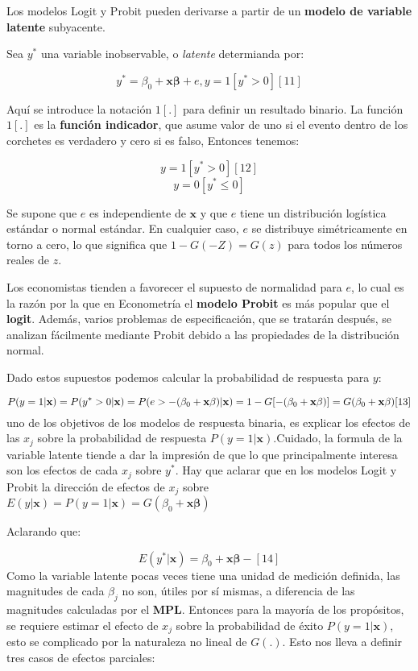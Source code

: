 \documentclass[
  letterpaper,
  DIV=11,
  numbers=noendperiod]{scrreprt}
\begin{document}
Los modelos Logit y Probit pueden derivarse a partir de un
\textbf{modelo de variable latente} subyacente.

Sea \(y^*\) una variable inobservable, o \emph{latente} determianda por:

\[y^*=\beta_0+ \mathbf{x\beta}+e, y=1[y^*>0][11]\]

Aquí se introduce la notación \(1[.]\) para definir un resultado
binario. La función \(1[.]\) es la \textbf{función indicador}, que asume
valor de uno si el evento dentro de los corchetes es verdadero y cero si
es falso, Entonces tenemos:

\[y=1[y^*>0][12]\] \[y=0[y^*\leq0]\]

Se supone que \(e\) es independiente de \(\mathbf{x}\) y que \(e\) tiene
un distribución logística estándar o normal estándar. En cualquier caso,
\(e\) se distribuye simétricamente en torno a cero, lo que significa que
\(1-G(-Z)=G(z)\) para todos los números reales de \(z\).

Los economistas tienden a favorecer el supuesto de normalidad para
\(e\), lo cual es la razón por la que en Econometría el \textbf{modelo
Probit} es más popular que el \textbf{logit}. Además, varios problemas
de especificación, que se tratarán después, se analizan fácilmente
mediante Probit debido a las propiedades de la distribución normal.

Dado estos supuestos podemos calcular la probabilidad de respuesta para
\(y\):

\[P(y=1|\mathbf{x})=P(y^*>0|\mathbf{x})=P(e>-(\beta_0+\mathbf{x\beta})|\mathbf{x})=\\1-G[-(\beta_0+\mathbf{x\beta})]=G(\beta_0+\mathbf{x\beta})[13]\]
uno de los objetivos de los modelos de respuesta binaria, es explicar
los efectos de las \(x_j\) sobre la probabilidad de respuesta
\(P(y=1|\mathbf{x})\).Cuidado, la formula de la variable latente tiende
a dar la impresión de que lo que principalmente interesa son los efectos
de cada \(x_j\) sobre \(y^*\). Hay que aclarar que en los modelos Logit
y Probit la dirección de efectos de \(x_j\) sobre
\(E(y|\mathbf{x})=P(y=1|\mathbf{x})=G(\beta_0+\mathbf{x\beta})\)

Aclarando que:

\[E(y^*|\mathbf{x})=\beta_0+\mathbf{x\beta}-[14]\] Como la variable
latente pocas veces tiene una unidad de medición definida, las
magnitudes de cada \(\beta_j\) no son, útiles por sí mismas, a
diferencia de las magnitudes calculadas por el \textbf{MPL}. Entonces
para la mayoría de los propósitos, se requiere estimar el efecto de
\(x_j\) sobre la probabilidad de éxito \(P(y=1|\mathbf{x})\), esto se
complicado por la naturaleza no lineal de \(G(.)\). Esto nos lleva a
definir tres casos de efectos parciales:
\end{document}
